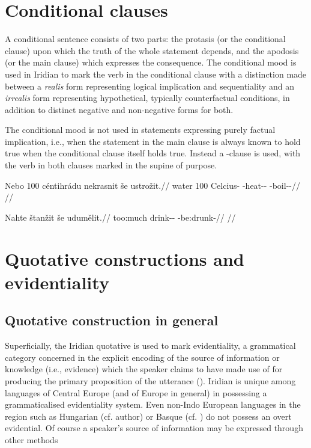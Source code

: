 \section{Conditional clauses}

A conditional sentence consists of two parts: the protasis (or the conditional
clause) upon which the truth of the whole statement depends, and the apodosis
(or the main clause) which expresses the consequence. The conditional mood is
used in Iridian to mark the verb in the conditional clause with a distinction
made between a \emph{realis} form representing logical implication and
sequentiality and an \emph{irrealis} form representing hypothetical, typically
counterfactual conditions, in addition to distinct negative and non-negative
forms for both.

The conditional mood is not used in statements expressing purely factual
implication, i.e., when the statement in the main clause is always known to hold
true when the conditional clause itself holds true. Instead a -clause is
used, with the verb in both clauses marked in the supine of purpose.

\pex
\begingl
\gla Nebo 100 céntihrádu nekrasnit še ustrožit.//
\glb water 100 Celcius-\Ins{} \Caus{}-heat-\Pv{}-\SupP{} \Com{} \Refl{}-boil-\Av{}-\SupP{}//
\glft {}//
\endgl
\xe

\pex
\begingl
\gla Nahte štanžit še udumělit.//
\glb too:much drink-\Av-\SupP{} \Com{} \Refl{}-be:drunk-\SupP{}//
\glft {}//
\endgl
\xe

\section{Quotative constructions and  evidentiality}\label{sec:reportedspeech}


\subsection{Quotative construction in general}

Superficially, the Iridian quotative is used to mark {\sc evidentiality}, a
grammatical category concerned in the explicit encoding of the source of
information or knowledge (i.e., evidence) which the speaker claims to have made
use of for producing the primary proposition of the utterance
(\cite[1-2]{diewald2010}). Iridian is unique among languages of Central Europe
(and of Europe in general) in possessing a grammaticalised evidentiality system.
Even non-Indo European languages in the region such as Hungarian (cf. author) or
Basque (cf. \cite{alcazar2010}) do not possess an overt evidential. Of course a
speaker’s source of information may be expressed through other methods

